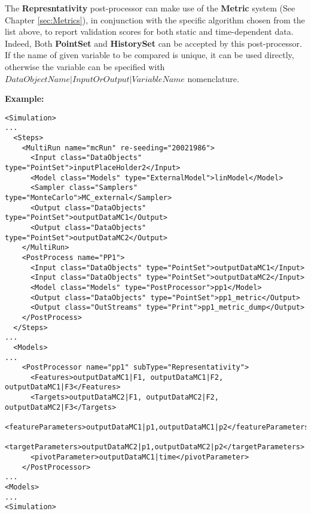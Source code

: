 The \textbf{Represntativity} post-processor can make use of the \textbf{Metric} system (See Chapter \ref{sec:Metrics}),
in conjunction with the specific algorithm chosen from the list above,
to report validation scores for both static and time-dependent data.
Indeed, Both \textbf{PointSet} and \textbf{HistorySet} can be accepted by this post-processor.
If the name of given variable to be compared is unique, it can be used directly, otherwise the variable can be specified
with $DataObjectName|InputOrOutput|VariableName$ nomenclature.

\textbf{Example:}
\begin{lstlisting}[style=XML,morekeywords={subType}]
<Simulation>
...
  <Steps>
    <MultiRun name="mcRun" re-seeding="20021986">
	  <Input class="DataObjects" type="PointSet">inputPlaceHolder2</Input>
	  <Model class="Models" type="ExternalModel">linModel</Model>
	  <Sampler class="Samplers" type="MonteCarlo">MC_external</Sampler>
	  <Output class="DataObjects" type="PointSet">outputDataMC1</Output>
	  <Output class="DataObjects" type="PointSet">outputDataMC2</Output>
	</MultiRun>
	<PostProcess name="PP1">
	  <Input class="DataObjects" type="PointSet">outputDataMC1</Input>
	  <Input class="DataObjects" type="PointSet">outputDataMC2</Input>
	  <Model class="Models" type="PostProcessor">pp1</Model>
	  <Output class="DataObjects" type="PointSet">pp1_metric</Output>
	  <Output class="OutStreams" type="Print">pp1_metric_dump</Output>
	</PostProcess>
  </Steps>
...
  <Models>
...
	<PostProcessor name="pp1" subType="Representativity">
	  <Features>outputDataMC1|F1, outputDataMC1|F2, outputDataMC1|F3</Features>
	  <Targets>outputDataMC2|F1, outputDataMC2|F2, outputDataMC2|F3</Targets>
	  <featureParameters>outputDataMC1|p1,outputDataMC1|p2</featureParameters>
	  <targetParameters>outputDataMC2|p1,outputDataMC2|p2</targetParameters>
	  <pivotParameter>outputDataMC1|time</pivotParameter>
	</PostProcessor>
...
<Models>
...
<Simulation>
\end{lstlisting}
